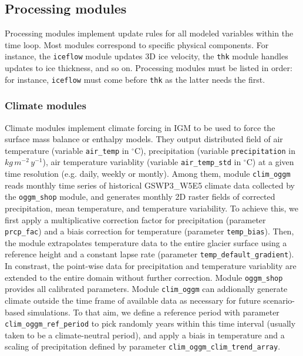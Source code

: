 \documentclass[10pt,twocolumn]{article}
\begin{document}
\subsection{Processing modules}

Processing modules implement update rules for all modeled variables within the time loop. 
Most modules correspond to specific physical components. 
For instance, the \texttt{iceflow} module updates 3D ice velocity, 
the \texttt{thk} module handles updates to ice thickness, and so on.
Processing modules must be listed in order: for instance, \texttt{iceflow} must come
before \texttt{thk} as the latter needs the first.

\subsubsection{Climate modules}
\label{module_climate}

Climate modules implement climate forcing in IGM to be used to force the surface 
mass balance or enthalpy models. They output distributed field
of air temperature (variable \texttt{air\_temp} in $^{\circ}$C), 
precipitation (variable \texttt{precipitation} in $kg\,  m^{-2} \, y^{-1}$),
air temperature variablity (variable \texttt{air\_temp\_std} in $^{\circ}$C)
at a given time resolution (e.g. daily, weekly or montly).
Among them, module \texttt{clim\_oggm} reads monthly time series of historical GSWP3\_W5E5 
climate data collected by the \texttt{oggm\_shop} module, and generates monthly 2D 
raster fields of corrected precipitation, mean temperature, and temperature variability.
To achieve this, we first apply a multiplicative correction factor for precipitation
(parameter \texttt{prcp\_fac}) and a biais correction for temperature (parameter \texttt{temp\_bias}).
Then, the module extrapolates temperature data to the entire glacier surface using a reference
height and a constant lapse rate (parameter \texttt{temp\_default\_gradient}). 
In constrast, the point-wise data for precipitation and temperature variablity 
are extended to the entire domain without further correction. 
Module \texttt{oggm\_shop} provides all calibrated parameters.
Module \texttt{clim\_oggm} can addionally generate climate outside the time 
frame of available data as necessary for future scenario-based simulations.
To that aim, we define a reference period with parameter \texttt{clim\_oggm\_ref\_period} 
to pick randomly years within this time interval (usually taken to be a climate-neutral period), 
and apply a biais in temperature and a scaling of precipitation defined by parameter
\texttt{clim\_oggm\_clim\_trend\_array}.
 
\end{document}
